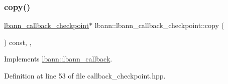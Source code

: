 \mbox{\label{classlbann_1_1lbann__callback__checkpoint_a63dc49f38f063f9b85d9abdf8b2855aa}} 
\subsubsection{\texorpdfstring{copy()}{copy()}}
{\footnotesize\ttfamily \hyperlink{classlbann_1_1lbann__callback__checkpoint}{lbann\+\_\+callback\+\_\+checkpoint}$\ast$ lbann\+::lbann\+\_\+callback\+\_\+checkpoint\+::copy (\begin{DoxyParamCaption}{ }\end{DoxyParamCaption}) const\hspace{0.3cm}{\ttfamily [inline]}, {\ttfamily [override]}, {\ttfamily [virtual]}}



Implements \hyperlink{classlbann_1_1lbann__callback_a9f545d1269a8c7af335625d049691f26}{lbann\+::lbann\+\_\+callback}.



Definition at line 53 of file callback\+\_\+checkpoint.\+hpp.


